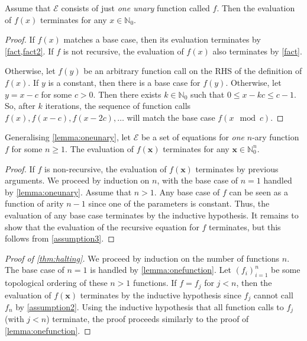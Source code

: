 \documentclass[a4paper,UKenglish,cleveref,autoref,thm-restate]{lipics-v2021}
\begin{document}
\begin{lemma}\label{lemma:oneunary}
  Assume that $\mathcal{E}$ consists of just \emph{one unary} function called
  $f$. Then the evaluation of $f(x)$ terminates for any $x \in \mathbb{N}_{0}$.
\end{lemma}
\begin{proof}
  If $f(x)$ matches a base case, then its evaluation terminates by
  \cref{fact,fact2}. If $f$ is not recursive, the evaluation of $f(x)$ also
  terminates by \cref{fact}.

  Otherwise, let $f(y)$ be an arbitrary function call on the RHS of the
  definition of $f(x)$. If $y$ is a constant, then there is a base case for
  $f(y)$. Otherwise, let $y = x - c$ for some $c > 0$. Then there exists
  $k \in \mathbb{N}_{0}$ such that $0 \le x - kc \le c-1$. So, after $k$
  iterations, the sequence of function calls $f(x), f(x-c), f(x-2c),\dots$ will
  match the base case $f(x \mod c)$.
\end{proof}

\begin{lemma}\label{lemma:onefunction}
  Generalising \cref{lemma:oneunary}, let $\mathcal{E}$ be a set of equations
  for \emph{one} $n$-ary function $f$ for some $n \ge 1$. The evaluation of
  $f(\mathbf{x})$ terminates for any $\mathbf{x} \in \mathbb{N}_{0}^{n}$.
\end{lemma}
\begin{proof}
  If $f$ is non-recursive, the evaluation of $f(\mathbf{x})$ terminates by
  previous arguments. We proceed by induction on $n$, with the base case of
  $n=1$ handled by \cref{lemma:oneunary}. Assume that $n > 1$. Any base case of
  $f$ can be seen as a function of arity $n-1$ since one of the parameters is
  constant. Thus, the evaluation of any base case terminates by the inductive
  hypothesis. It remains to show that the evaluation of the recursive equation
  for $f$ terminates, but this follows from \cref{assumption3}.
\end{proof}

\begin{proof}[Proof of \cref{thm:halting}]
  We proceed by induction on the number of functions $n$. The base case of $n=1$
  is handled by \cref{lemma:onefunction}. Let ${(f_{i})}_{i=1}^{n}$ be some
  topological ordering of these $n > 1$ functions. If $f = f_{j}$ for $j < n$,
  then the evaluation of $f(\mathbf{x})$ terminates by the inductive hypothesis
  since $f_{j}$ cannot call $f_{n}$ by \cref{assumption2}. Using the inductive
  hypothesis that all function calls to $f_{j}$ (with $j < n$) terminate, the
  proof proceeds similarly to the proof of \cref{lemma:onefunction}.
\end{proof}
\end{document}
